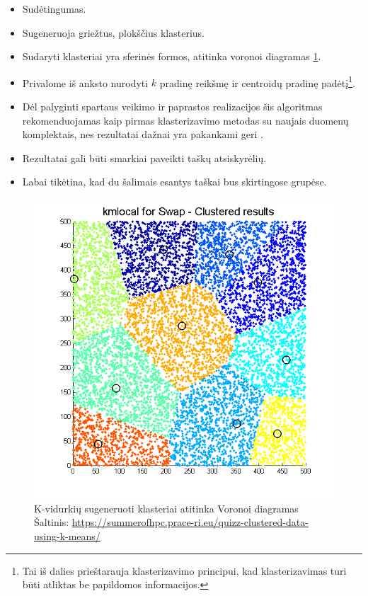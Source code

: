 \documentclass{VUMIFInfKursinis}
\begin{document}

\begin{itemize}

\item
  Sudėtingumas.
\item
  Sugeneruoja griežtus, plokščius klasterius. 
\item
  Sudaryti klasteriai yra sferinės formos, atitinka voronoi diagramas \ref{img:voronoi}.
\item
  Privalome iš anksto nurodyti $k$ pradinę reikšmę ir centroidų
  pradinę padėtį\footnote{Tai iš dalies prieštarauja klasterizavimo
    principui, kad klasterizavimas turi būti atliktas be papildomos
    informacijos.}.
\item
  Dėl palyginti spartaus veikimo ir paprastos realizacijos šis
  algoritmas rekomenduojamas kaip pirmas klasterizavimo metodas su
  naujais duomenų komplektais, nes rezultatai dažnai yra pakankami geri \cite{arthur2006slow}.
\item
  Rezultatai gali būti smarkiai paveikti taškų atsiskyrėlių.
\item
  Labai tikėtina, kad du šalimais esantys taškai bus skirtingose
  grupėse.
\end{itemize}

\begin{figure}[H]
  \centering
  \includegraphics[scale=.5]{img/voronoi}
  \caption{K-vidurkių sugeneruoti klasteriai atitinka Voronoi diagramas\\
           Šaltinis: \url{https://summerofhpc.prace-ri.eu/quizz-clustered-data-using-k-means/}}
\label{img:voronoi}
\end{figure}
\end{document}

